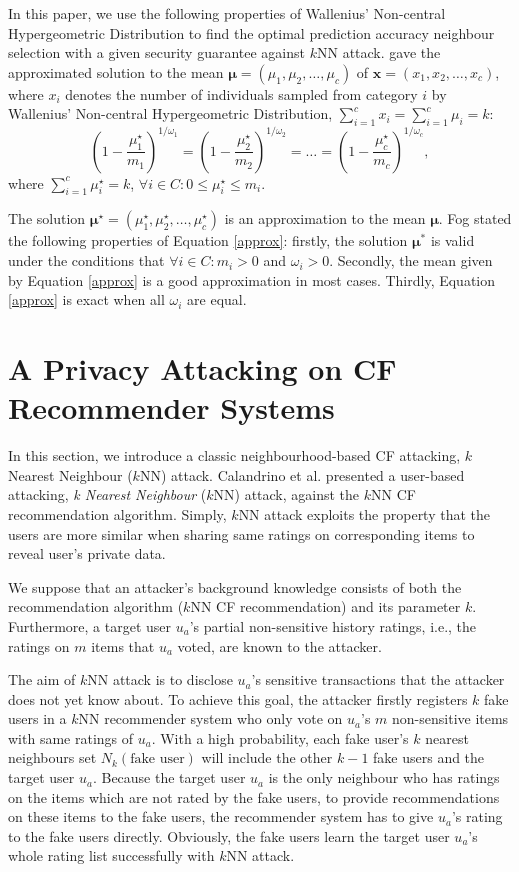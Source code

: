 \documentclass[11pt]{article}
\begin{document}
In this paper, we use the following properties of Wallenius' Non-central Hypergeometric Distribution to find the optimal prediction accuracy neighbour selection with a given security guarantee against $k$NN attack. \cite{MANLY1974} gave the approximated solution to the mean $\bm{\mu}=(\mu_{1},\mu_{2},\ldots,\mu_{c})$ of $\bm{x}=(x_1,x_2,\ldots,x_c)$, where $x_i$ denotes the number of individuals sampled from category $i$ by Wallenius' Non-central Hypergeometric Distribution, $\sum_{i=1}^{c}{x_i}=\sum_{i=1}^{c}{\mu_i}=k$:
\begin{equation}
\label{approx}
\left(1-\frac{\mu_1^\star}{m_1}\right)^{1/\omega_1}=\left(1-\frac{\mu_2^\star}{m_2}\right)^{1/\omega_2}=\ldots=\left(1-\frac{\mu_c^\star}{m_c}\right)^{1/\omega_c},
\end{equation}
where $\sum_{i=1}^{c}{\mu_i^\star}=k$, $\forall i\in C: 0\leq \mu_i^\star \leq m_i.$

The solution $\bm{\mu}^\star=(\mu_{1}^\star,\mu_{2}^\star,\ldots,\mu_{c}^\star)$ is an approximation to the mean $\bm \mu$. Fog \cite{FOG2008} stated the following properties of Equation \eqref{approx}: firstly, the solution $\bm{\mu}^*$ is valid under the conditions that $\forall i \in C: m_i>0$ and $\omega_i>0$. Secondly, the mean given by Equation \eqref{approx} is a good approximation in most cases. Thirdly, Equation \eqref{approx} is exact when all $\omega_i$ are equal.


\section{A Privacy Attacking on CF Recommender Systems}
\label{ATK}
In this section, we introduce a classic neighbourhood-based CF attacking, $k$ Nearest Neighbour ($k$NN) attack. Calandrino et al. \cite{CALANDRINO2011} presented a user-based attacking, \textit{k Nearest Neighbour} ($k$NN) attack, against the $k$NN CF recommendation algorithm. Simply, $k$NN attack exploits the property that the users are more similar when sharing same ratings on corresponding items to reveal user's private data.

We suppose that an attacker's background knowledge consists of both the recommendation algorithm ($k$NN CF recommendation) and its parameter $k$. Furthermore, a target user $u_a$'s partial non-sensitive history ratings, i.e., the ratings on $m$ items that $u_a$ voted, are known to the attacker.

The aim of $k$NN attack is to disclose $u_a$'s sensitive transactions that the attacker does not yet know about. To achieve this goal, the attacker firstly registers $k$ fake users in a $k$NN recommender system who only vote on $u_a$'s $m$ non-sensitive items with same ratings of $u_a$. With a high probability, each fake user's $k$ nearest neighbours set $N_k(\text{fake user})$ will include the other $k-1$ fake users and the target user $u_a$. Because the target user $u_a$ is the only neighbour who has ratings on the items which are not rated by the fake users, to provide recommendations on these items to the fake users, the recommender system has to give $u_a$'s rating to the fake users directly. Obviously, the fake users learn the target user $u_a$'s whole rating list successfully with $k$NN attack.
\end{document}
